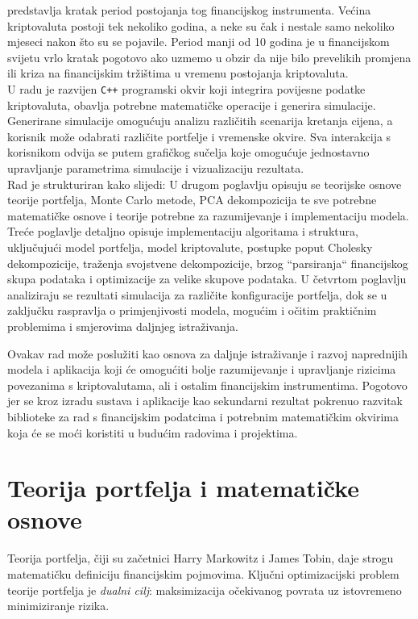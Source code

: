 \documentclass[zavrsnirad, upload]{fer}
\begin{document}
predstavlja kratak period postojanja tog financijskog instrumenta.
Većina kriptovaluta postoji tek nekoliko godina, a neke su čak i
nestale samo nekoliko mjeseci nakon što su se pojavile. Period manji od
10 godina je u financijskom svijetu vrlo kratak pogotovo ako uzmemo u obzir
da nije bilo prevelikih promjena ili kriza na financijskim tržištima
u vremenu postojanja kriptovaluta.\\
U radu je razvijen \texttt{C++} programski okvir koji integrira povijesne podatke
kriptovaluta, obavlja potrebne matematičke operacije i generira simulacije.
Generirane simulacije omogućuju analizu različitih scenarija kretanja cijena,
a korisnik može odabrati različite portfelje i vremenske okvire.
Sva interakcija s korisnikom odvija se putem grafičkog sučelja koje
omogućuje jednostavno upravljanje parametrima simulacije i vizualizaciju
rezultata.\\
Rad je strukturiran kako slijedi: U drugom poglavlju opisuju se teorijske
osnove teorije portfelja, Monte Carlo metode, PCA dekompozicija te
sve potrebne matematičke osnove i teorije potrebne za razumijevanje
i implementaciju modela.
Treće poglavlje detaljno opisuje implementaciju algoritama i struktura, uključujući
model portfelja, model kriptovalute, postupke poput Cholesky dekompozicije,
traženja svojstvene dekompozicije, brzog ``parsiranja`` financijskog skupa podataka
i optimizacije za velike skupove podataka.
U četvrtom poglavlju analiziraju se rezultati simulacija za različite
konfiguracije portfelja, dok se u zaključku raspravlja o primjenjivosti
modela, mogućim i očitim praktičnim problemima i smjerovima daljnjeg istraživanja.

Ovakav rad može poslužiti kao osnova za daljnje istraživanje i razvoj
naprednijih modela i aplikacija koji će omogućiti bolje razumijevanje i upravljanje
rizicima povezanima s kriptovalutama, ali i ostalim financijskim instrumentima.
Pogotovo jer se kroz izradu sustava i aplikacije kao sekundarni rezultat
pokrenuo razvitak biblioteke za rad s financijskim podatcima i potrebnim
matematičkim okvirima koja će se moći koristiti u budućim radovima i projektima.

\chapter{Teorija portfelja i matematičke osnove}
\label{pog:teorija_portelja}
Teorija portfelja, čiji su začetnici Harry Markowitz i James Tobin,
daje strogu matematičku definiciju financijskim pojmovima.
Ključni optimizacijski problem teorije portfelja je
\textit{dualni cilj}: maksimizacija očekivanog povrata
uz istovremeno minimiziranje rizika.
\end{document}
